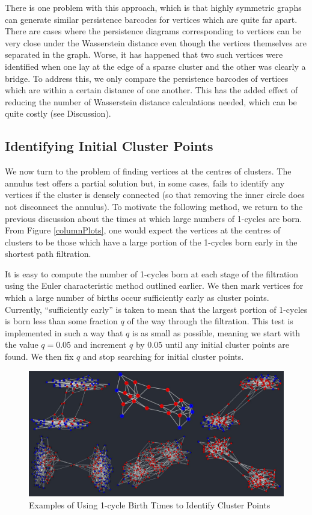 \documentclass[12pt,a4paper]{amsart}
\numberwithin{equation}{section}
\theoremstyle{plain}
\theoremstyle{definition}
\begin{document}
There is one problem with this approach, which is that highly symmetric graphs can generate similar persistence barcodes for vertices which are quite far apart. There are cases where the persistence diagrams corresponding to vertices can be very close under the Wasserstein distance even though the vertices themselves are separated in the graph. Worse, it has happened that two such vertices were identified when one lay at the edge of a sparse cluster and the other was clearly a bridge. To address this, we only compare the persistence barcodes of vertices which are within a certain distance of one another. This has the added effect of reducing the number of Wasserstein distance calculations needed, which can be quite costly (see Discussion).

\subsection{Identifying Initial Cluster Points}

We now turn to the problem of finding vertices at the centres of clusters. The annulus test offers a partial solution but, in some cases, fails to identify any vertices if the cluster is densely connected (so that removing the inner circle does not disconnect the annulus). To motivate the following method, we return to the previous discussion about the times at which large numbers of 1-cycles are born. From Figure \ref{columnPlots}, one would expect the vertices at the centres of clusters to be those which have a large portion of the 1-cycles born early in the shortest path filtration. 

It is easy to compute the number of 1-cycles born at each stage of the filtration using the Euler characteristic method outlined earlier. We then mark vertices for which a large number of births occur sufficiently early as cluster points. Currently, ``sufficiently early'' is taken to mean that the largest portion of 1-cycles is born less than some fraction $q$ of the way through the filtration. This test is implemented in such a way that $q$ is as small as possible, meaning we start with the value $q=0.05$ and increment $q$ by $0.05$ until any initial cluster points are found. We then fix $q$ and stop searching for initial cluster points.

\begin{figure}[h]
	\centering
	\includegraphics[scale=0.55]{InitialClusterPoints.jpg}
	\caption{Examples of Using 1-cycle Birth Times to Identify Cluster Points}
	\label{birthTimesTest}
\end{figure}
\end{document}
